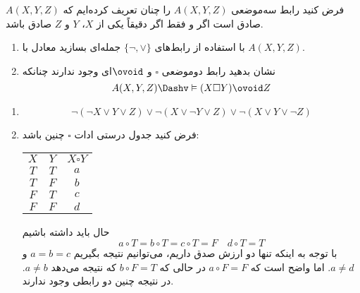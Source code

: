 فرض کنید رابط سه‌موضعی $A(X,Y,Z)$ را چنان تعریف کرده‌ایم که $A(X,Y,Z)$ صادق است اگر و فقط اگر دقیقاً یکی از $X$، $Y$ و $Z$ صادق باشد.

\begin{enumerate}[label=(\alph*)]
\item
با استفاده از رابط‌های
$\{\neg,\vee\}$
جمله‌ای بسازید معادل با
$A(X,Y,Z)$.
\item
نشان بدهید رابط دوموضعی $\square$ و $\ovoid$ای وجود ندارند چنانکه
$$
A(X,Y,Z)\Dashv\vDash(X\square Y)\ovoid Z
$$
\end{enumerate}\quad
\begin{ans}
\begin{enumerate}
\item
$$
\neg(\neg X\vee Y\vee Z)\vee\neg(X\vee\neg Y\vee Z)\vee\neg(X\vee Y\vee\neg Z)
$$
\item
فرض کنید جدول درستی ادات
$\square$
چنین باشد:

\begin{tabular}{c|c|c}
$X$ & $Y$ & $X\square Y$ \\
$T$ & $T$ & $a$ \\
$T$ & $F$ & $b$ \\
$F$ & $T$ & $c$ \\
$F$ & $F$ & $d$ \\
\end{tabular}

حال باید داشته باشیم
$$
a\circ T = b\circ T = c\circ T = F \quad d\circ T = T
$$
با توجه به اینکه تنها دو ارزش صدق داریم، می‌توانیم نتیجه بگیریم
$a=b=c$
و
$a\neq d$.
اما واضح است که
$a\circ F=F$
در حالی که
$b\circ F=T$
که نتیجه می‌دهد
$a\neq b$.
در نتیجه چنین دو رابطی وجود ندارند.

\end{enumerate}
\end{ans}
